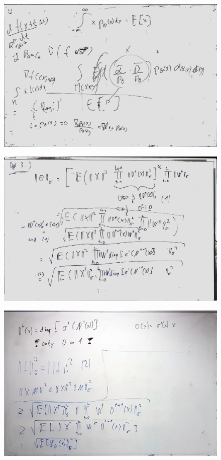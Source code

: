 \documentclass[a4paper]{article}
\begin{document}
\begin{figure}[htb]
	\centering
	\includegraphics[width=\textwidth]{whiteboard_notes/14.jpg}
\end{figure}

\begin{figure}[htb]
	\centering
	\includegraphics[width=\textwidth]{whiteboard_notes/15.jpg}
\end{figure}

\begin{figure}[htb]
	\centering
	\includegraphics[width=\textwidth]{whiteboard_notes/16.jpg}
\end{figure}
\end{document}
